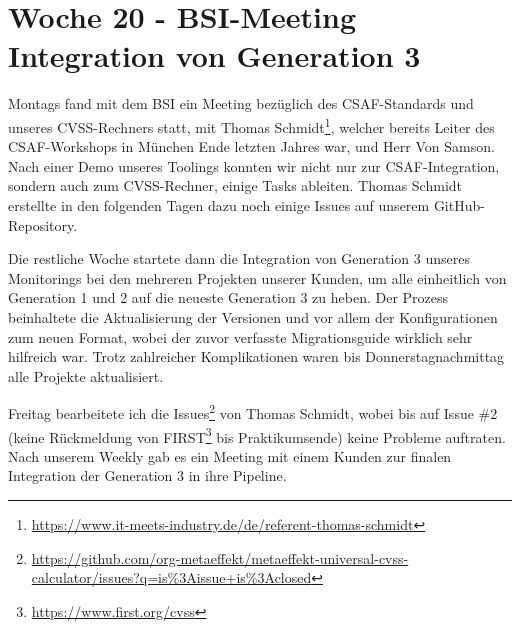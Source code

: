 \section{Woche 20 - BSI-Meeting \headerand Integration von Generation 3} \label{sec:bericht-wo-20}


\lweekdaymarginpar{\weekdayMondayLong}

Montags fand mit dem BSI ein Meeting bezüglich des CSAF-Standards und unseres CVSS-Rechners statt, mit Thomas Schmidt\footnote{\url{https://www.it-meets-industry.de/de/referent-thomas-schmidt}}, welcher bereits Leiter des CSAF-Workshops in München Ende letzten Jahres war, und Herr Von Samson.
Nach einer Demo unseres Toolings konnten wir nicht nur zur CSAF-Integration, sondern auch zum CVSS-Rechner, einige Tasks ableiten.
Thomas Schmidt erstellte in den folgenden Tagen dazu noch einige Issues auf unserem GitHub-Repository.

\sweekdaymarginpar{\weekdayTuesdayShort, \weekdayWednesdayShort, \weekdayThursdayShort}

Die restliche Woche startete dann die Integration von Generation 3 unseres Monitorings bei den mehreren Projekten unserer Kunden, um alle einheitlich von Generation 1 und 2 auf die neueste Generation 3 zu heben.
Der Prozess beinhaltete die Aktualisierung der Versionen und vor allem der Konfigurationen zum neuen Format, wobei der zuvor verfasste Migrationsguide wirklich sehr hilfreich war.
Trotz zahlreicher Komplikationen waren bis Donnerstagnachmittag alle Projekte aktualisiert.

\sweekdaymarginpar{\weekdayFridayLong}

Freitag bearbeitete ich die Issues\footnote{\url{https://github.com/org-metaeffekt/metaeffekt-universal-cvss-calculator/issues?q=is\%3Aissue+is\%3Aclosed}} von Thomas Schmidt, wobei bis auf Issue \#2 (keine Rückmeldung von FIRST\footnote{\url{https://www.first.org/cvss}} bis Praktikumsende) keine Probleme auftraten.
Nach unserem Weekly gab es ein Meeting mit einem Kunden zur finalen Integration der Generation 3 in ihre Pipeline.
